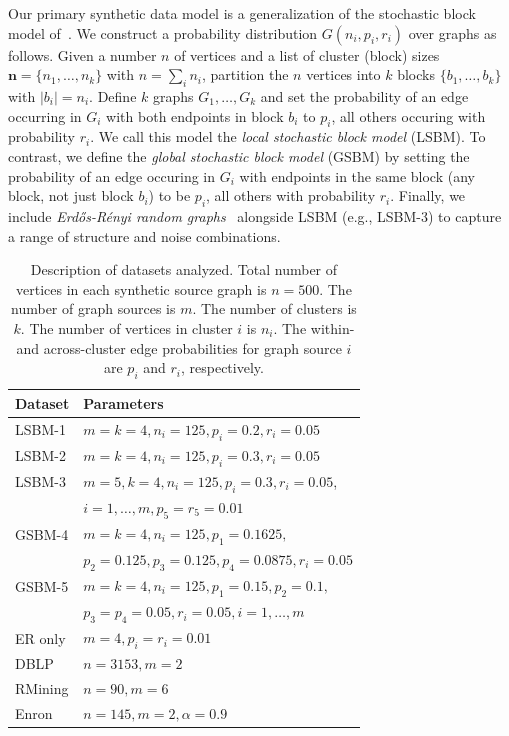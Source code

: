 \documentclass{article}
\newcommand{\er}{Erd\H{o}s-R\'{e}nyi }
\begin{document}
Our primary synthetic data model is a generalization of the stochastic block
model of~\cite{Wang87}. We construct a probability distribution $G(n_i, p_i,
r_i)$ over graphs as follows. Given a number $n$ of vertices and a list of
cluster (block) sizes $\mathbf{n}=\{n_1, \dots, n_k\}$ with $n=\sum_i n_i$,
partition the $n$ vertices into $k$ blocks $\{b_1, \dots, b_k\}$ with
$|b_i|=n_i$. Define $k$ graphs $G_1, \dots, G_k$ and set the probability
of an edge occurring in $G_i$ with both endpoints in block $b_i$ to $p_i$, all
others occuring with probability $r_i$. We call this model the \emph{local
stochastic block model} (LSBM). To contrast, we define the \emph{global
stochastic block model} (GSBM) by setting the probability of an edge occuring
in $G_i$ with endpoints in the same block (any block, not just block $b_i$) to
be $p_i$, all others with probability $r_i$. Finally, we include \emph{\er
random graphs}~\cite{Erdos60} alongside LSBM (e.g., LSBM-3) to capture a range
of structure and noise combinations.

\begin{table}
\begin{tabular}{| l | l |}
\hline
Dataset & Parameters\\
\hline 
\hline
LSBM-1  &  $m=k=4, n_i=125, p_i=0.2, r_i=0.05$ \\
LSBM-2  &  $m=k=4, n_i=125, p_i=0.3, r_i=0.05$ \\
LSBM-3  &  $m=5,k=4, n_i=125, p_i=0.3, r_i=0.05$, \\ 
        &  $i = 1, \dots, m, p_5= r_5 = 0.01$ \\
\hline
GSBM-4  &  $m =k= 4, n_i=125, p_1=0.1625, $ \\ 
        &  $p_2 = 0.125, p_3 = 0.125, p_4 = 0.0875, r_i = 0.05$ \\
       
GSBM-5  &  $m=k=4, n_i=125, p_1=0.15, p_2=0.1,$ \\ 
        &  $p_3=p_4=0.05, r_i = 0.05, i=1, \ldots, m$ \\

\hline
ER only &  $m=4, p_i=r_i=0.01$ \\
DBLP    &  $n = 3153, m = 2$ \\
RMining &  $n = 90, m = 6$ \\
Enron   &  $n = 145, m = 2, \alpha=0.9$ \\
\hline
\end{tabular}
\caption{Description of datasets analyzed. Total number of vertices in each
synthetic source graph is $n=500$. The number of graph sources is $m$. The
number of clusters is $k$. The number of vertices in cluster $i$ is $n_i$. 
The within- and across-cluster edge probabilities for graph source $i$ are
$p_i$ and $r_i$, respectively.}
\label{datasets}
\end{table}
\end{document}
